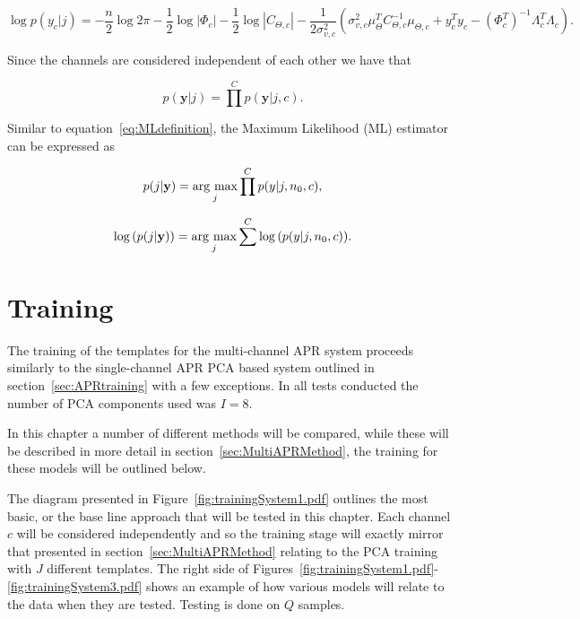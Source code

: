 \begin{equation}\label{eq:loglikeli_c}
\log{p(y_c|j)} = - \frac{n}{2}\log{2 \pi}- \frac{1}{2}\log{|\Phi_c|} - \frac{1}{2}\log{|C_{\Theta,c}|} - \frac{1}{2\sigma^2_{v,c}}\left(\sigma_{v,c}^2\mu_\Theta^TC_{\Theta,c}^{-1}\mu_{\Theta,c} + y_c^Ty_c- \left(\Phi_c^T\right)^{-1}\Lambda_c^T\Lambda_c\right).
\end{equation}

Since the channels are considered independent of each other we have that

\begin{equation}\label{eq:jointprob_c}
p(\textbf{y} | j) = \prod^C p(\textbf{y} | j, c).
\end{equation}

Similar to equation~\ref{eq:MLdefinition}, the Maximum Likelihood (ML) estimator can be expressed as

\begin{equation}\label{eq:MLdefinition_c}
p(j |\textbf{y}) = \underset{j}{\mathrm{arg~max}} \prod^C p(y|j,n_0,c),
\end{equation}

\begin{equation}\label{eq:MLdefinition2_c}
\log{\left( p(j |\textbf{y})\right)} = \underset{j}{\mathrm{arg~max}} \sum^C \log{\left( p(y|j,n_0,c) \right)}.
\end{equation}

\section{Training}\label{sec:MultiAPRTraining}
The training of the templates for the multi-channel APR system proceeds similarly to the single-channel APR PCA based system outlined in section~\ref{sec:APRtraining} with a few exceptions. In all tests conducted the number of PCA components used was $I = 8$.

In this chapter a number of different methods will be compared, while these will be described in more detail in section~\ref{sec:MultiAPRMethod}, the training for these models will be outlined below.

The diagram presented in Figure~\ref{fig:trainingSystem1.pdf} outlines the most basic, or the base line approach that will be tested in this chapter. Each channel $c$ will be considered independently and so the training stage will exactly mirror that presented in section~\ref{sec:MultiAPRMethod} relating to the PCA training with $J$ different templates. The right side of Figures~\ref{fig:trainingSystem1.pdf}-\ref{fig:trainingSystem3.pdf} shows an example of how various models will relate to the data when they are tested. Testing is done on $Q$ samples.

